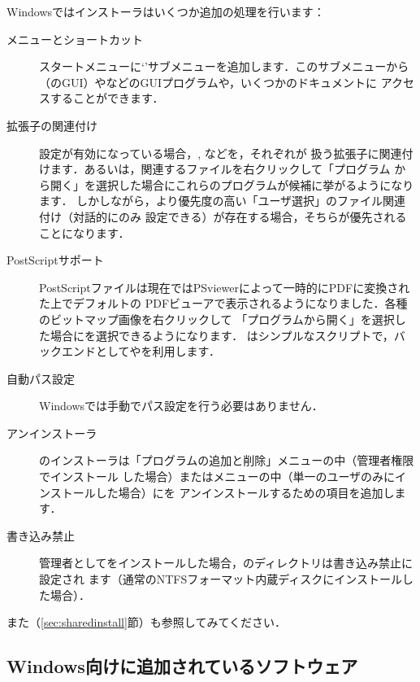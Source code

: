 \documentclass[uplatex,dvipdfmx,tombow]{jsarticle}
\begin{document}
Windowsでは\TL インストーラはいくつか追加の処理を行います：
%
\begin{description}
\item[メニューとショートカット]
スタートメニューに`\TL'サブメニューを追加します．このサブメニューから%
（のGUI）やなどのGUIプログラムや，いくつかのドキュメントに
アクセスすることができます．

\item[拡張子の関連付け]
設定が有効になっている場合，, などを，それぞれが
扱う拡張子に関連付けます．あるいは，関連するファイルを右クリックして「プログラム
から開く」を選択した場合にこれらのプログラムが候補に挙がるようになります．
しかしながら，より優先度の高い「ユーザ選択」のファイル関連付け（対話的にのみ
設定できる）が存在する場合，そちらが優先されることになります．

\item[PostScriptサポート]
PostScriptファイルは現在ではPSviewerによって一時的にPDFに変換された上でデフォルトの
PDFビューアで表示されるようになりました．各種のビットマップ画像を右クリックして
「プログラムから開く」を選択した場合にを選択できるようになります．
はシンプルなスクリプトで，バックエンドとしてやを利用します．

\item[自動パス設定]
Windowsでは手動でパス設定を行う必要はありません．

\item[アンインストーラ]
\TL のインストーラは「プログラムの追加と削除」メニューの中（管理者権限でインストール
した場合）または\TL メニューの中（単一のユーザのみにインストールした場合）に\TL を
アンインストールするための項目を追加します．

\item[書き込み禁止]
管理者として\TL をインストールした場合，\TL のディレクトリは書き込み禁止に設定され
ます（通常のNTFSフォーマット内蔵ディスクにインストールした場合）．
\end{description}

また（\ref{sec:sharedinstall}節）も参照してみてください．

\subsection{Windows向けに追加されているソフトウェア}
\end{document}
